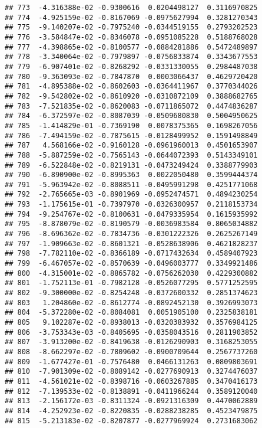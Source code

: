 \documentclass[
]{article}
\begin{document}
\begin{verbatim}
## 773  -4.316388e-02 -0.9300616  0.0204498127  0.3116970825
## 774  -4.925159e-02 -0.8167069 -0.0975627994  0.3281270343
## 775  -9.140207e-02 -0.7975240 -0.0344519155  0.2793202523
## 776  -3.584847e-02 -0.8346078 -0.0951085228  0.5188768028
## 777  -4.398865e-02 -0.8100577 -0.0884281886  0.5472489897
## 778  -3.340064e-02 -0.7979897 -0.0756833874  0.3343677553
## 779  -6.907401e-02 -0.8268292 -0.0331330055  0.2984487038
## 780  -9.363093e-02 -0.7847870  0.0003066437  0.4629720420
## 781  -4.895388e-02 -0.8602603 -0.0364411967  0.3770344026
## 782  -9.542802e-02 -0.8610920 -0.0310872109  0.3888682765
## 783  -7.521835e-02 -0.8620083 -0.0711865072  0.4474836287
## 784  -6.372597e-02 -0.8087039 -0.0509680830  0.5004950625
## 785  -1.414829e-01 -0.7369190  0.0078375365  0.1698267056
## 786  -7.494159e-02 -0.7875615 -0.0128499952  0.1591498849
## 787   4.568166e-02 -0.9160128 -0.0961960013  0.4501653907
## 788  -5.887259e-02 -0.7565143 -0.0644072393  0.5143349101
## 789  -6.522848e-02 -0.8219131 -0.0473249424  0.3388779903
## 790  -6.890900e-02 -0.8995363  0.0022050480  0.3599444374
## 791  -5.963942e-02 -0.8088511 -0.0495991298  0.4251771068
## 792  -2.765665e-03 -0.8901969 -0.0952474571  0.4894230254
## 793  -1.175615e-01 -0.7397970 -0.0326300957  0.2118153734
## 794  -9.254767e-02 -0.8100631 -0.0479335954  0.1615935992
## 795  -8.878079e-02 -0.8190579 -0.0036983584  0.8065034882
## 796  -8.696362e-02 -0.7834736 -0.0301222326  0.2625267149
## 797  -1.909663e-02 -0.8601321 -0.0528638906  0.4621828237
## 798  -7.782110e-02 -0.8366189 -0.0717432634  0.4589407923
## 799  -6.467057e-02 -0.8570639 -0.0496003777  0.3349921486
## 800  -4.315001e-02 -0.8865782 -0.0756262030  0.4229300882
## 801  -1.752113e-01 -0.7982128 -0.0526077295  0.5771252595
## 802  -9.300000e-02 -0.8254248 -0.0372600332  0.2851374623
## 803   1.204860e-02 -0.8612774 -0.0892452130  0.3926993073
## 804  -5.372280e-02 -0.8084081  0.0051905100  0.2325838181
## 805   9.102287e-02 -0.8938013 -0.0320383932  0.3576984125
## 806  -3.753343e-03 -0.8405695 -0.0358043516  0.2811903852
## 807  -3.913200e-02 -0.8419638 -0.0126290903  0.3168253055
## 808  -8.662297e-02 -0.7809602 -0.0900709644  0.2567737260
## 809  -1.677427e-01 -0.7576480  0.0466131263  0.0809803691
## 810  -7.901309e-02 -0.8089142 -0.0277690913  0.3274476037
## 811  -4.561021e-02 -0.8398716 -0.0603267885  0.3470416173
## 812  -7.139533e-02 -0.8138891 -0.0411966244  0.3589120040
## 813  -2.156172e-03 -0.8311324 -0.0921316309  0.4470062889
## 814  -4.252923e-02 -0.8220835 -0.0288238285  0.4523479875
## 815  -5.213183e-02 -0.8207877 -0.0277969924  0.2731683062

\end{verbatim}
\end{document}
